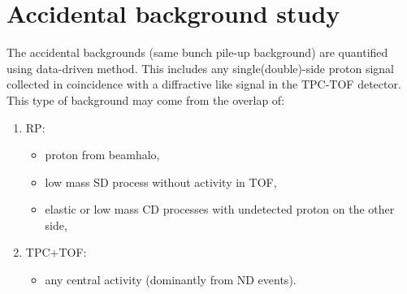 
\section{Accidental background study}

The accidental backgrounds (same bunch pile-up background) are quantified using data-driven method. This includes any single(double)-side proton signal collected in coincidence with a diffractive like signal in the TPC-TOF detector. This type of background may come from the overlap of:
\begin{enumerate}
	\item RP:
	\begin{itemize}
		\item proton from beamhalo,
		\item low mass SD process without activity in TOF,
		\item elastic or low mass CD processes with undetected proton on the other side,
	\end{itemize}
	\item TPC+TOF:
	\begin{itemize}
		\item any central activity (dominantly from ND events).
	\end{itemize}
\end{enumerate}
